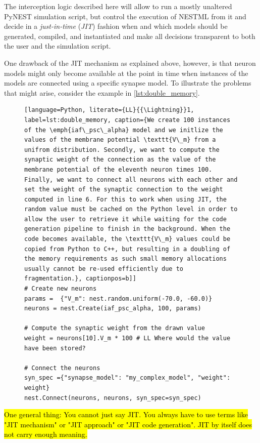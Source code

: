 The interception logic described here will allow to run a mostly unaltered PyNEST simulation script, but control the execution of NESTML from it and decide in a \emph{just-in-time} (\emph{JIT}) fashion when and which models should be generated, compiled, and instantiated and make all decisions transparent to both the user and the simulation script.

One drawback of the JIT mechanism as explained above, however, is that neuron models might only become available at the point in time when instances of the models are connected using a specific synapse model. To illustrate the problems that might arise, consider the example in \autoref{lst:double_memory}.

\begin{figure}[ht!]
  \centering
\begin{lstlisting}[language=Python, literate={LL}{{\Lightning}}1, label=lst:double_memory, caption={We create 100 instances of the \emph{iaf\_psc\_alpha} model and we initlize the values of the membrane potential \texttt{V\_m} from a unifrom distribution. Secondly, we want to compute the synaptic weight of the connection as the value of the membrane potential of the eleventh neuron times 100. Finally, we want to connect all neurons with each other and set the weight of the synaptic connection to the weight computed in line 6. For this to work when using JIT, the random value must be cached on the Python level in order to allow the user to retrieve it while waiting for the code generation pipeline to finish in the background. When the code becomes available, the \texttt{V\_m} values could be copied from Python to C++, but resulting in a doubling of the memory requirements as such small memory allocations usually cannot be re-used efficiently due to fragmentation.}, captionpos=b]]
# Create new neurons
params =  {"V_m": nest.random.uniform(-70.0, -60.0)}
neurons = nest.Create(iaf_psc_alpha, 100, params)

# Compute the synaptic weight from the drawn value
weight = neurons[10].V_m * 100 # LL Where would the value have been stored?

# Connect the neurons
syn_spec ={"synapse_model": "my_complex_model", "weight": weight}
nest.Connect(neurons, neurons, syn_spec=syn_spec)
\end{lstlisting}
\end{figure}

\hl{One general thing: You cannot just say JIT. You always have to use terms like "JIT mechanism" or "JIT approach" or "JIT code generation". JIT by itself does not carry enough meaning. }


